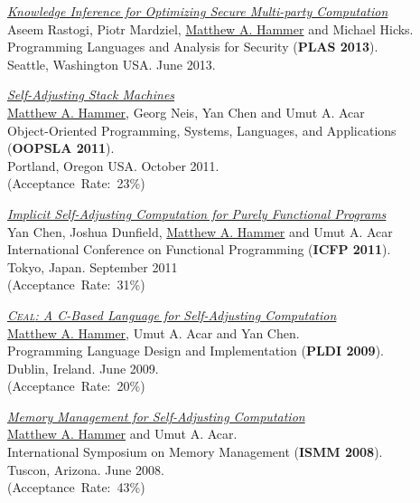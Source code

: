 \documentclass[10pt,letterpaper]{article}
\newcommand{\BeanCounter}[1]{(Acceptance~Rate:~#1\%)}
\renewenvironment{itemize}{
  \begin{list}{}{
    \setlength{\leftmargin}{1.5em}
    \setlength{\itemsep}{0.25em}
    \setlength{\parskip}{0pt}
    \setlength{\parsep}{0.25em}
  }
}{
  \end{list}
}
\begin{document}
\begin{itemize}
\item
\href{http://www.cs.umd.edu/~hammer/plas2013}
{\textit{Knowledge Inference for Optimizing Secure Multi-party Computation}}
\\
Aseem Rastogi, Piotr Mardziel, \underline{Matthew A. Hammer} and Michael Hicks.
\\
Programming Languages and Analysis for Security (\textbf{PLAS 2013}).
\\
Seattle, Washington USA. June 2013.

\item
\href{http://www.cs.umd.edu/~hammer/oopsla11}
{\textit{Self-Adjusting Stack Machines}}
\\
\underline{Matthew A. Hammer}, Georg Neis, Yan Chen and Umut A. Acar 
\\
Object-Oriented Programming, Systems, Languages, and Applications
(\textbf{OOPSLA 2011}).
\\
Portland, Oregon USA. October 2011.
\\
\BeanCounter{23}

\item
\href{http://www.cs.umd.edu/~hammer/icfp11}
{\textit{Implicit Self-Adjusting Computation for Purely Functional Programs}}
\\
Yan Chen, Joshua Dunfield, \underline{Matthew A. Hammer} and Umut A. Acar 
\\
International Conference on Functional Programming (\textbf{ICFP 2011}).
\\
Tokyo, Japan. September 2011
\\
\BeanCounter{31}

\item
\href{http://www.cs.umd.edu/~hammer/pldi09}
{\textit{\textsc{Ceal}: A C-Based Language for Self-Adjusting Computation}}
\\
\underline{Matthew A. Hammer}, Umut A. Acar and Yan Chen.
\\
Programming Language Design and Implementation (\textbf{PLDI 2009}).
\\
Dublin, Ireland. June 2009.
\\
\BeanCounter{20}

\item
\href{http://www.cs.umd.edu/~hammer/ismm08}
{\textit{Memory Management for Self-Adjusting Computation}}
\\
\underline{Matthew A. Hammer} and Umut A. Acar.
\\
International Symposium on Memory Management (\textbf{ISMM 2008}).
\\
Tuscon, Arizona. June 2008.
\\
\BeanCounter{43}


\end{itemize}
\end{document}
